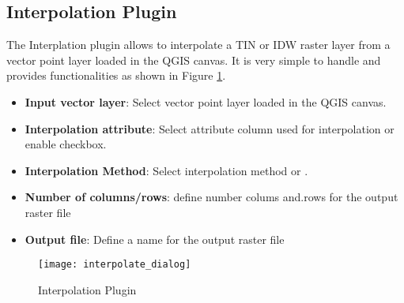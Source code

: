 
\subsection{Interpolation Plugin}


The Interplation plugin allows to interpolate a TIN or IDW raster layer from a vector 
point layer loaded in the QGIS canvas. It is very simple to handle and provides 
functionalities as shown in Figure \ref{fig:interpolation_dialog}.

\begin{itemize}
\item \textbf{Input vector layer}: Select vector point layer loaded in the QGIS canvas.
\item \textbf{Interpolation attribute}: Select attribute column used for interpolation or 
enable  checkbox.
\item \textbf{Interpolation Method}: Select interpolation method  or .
\item \textbf{Number of columns/rows}: define number colums and.rows for the output raster file
\item \textbf{Output file}: Define a name for the output raster file
\end{itemize}

\begin{figure}[ht]
   \begin{center}
   \caption{Interpolation Plugin \nixcaption}\label{fig:interpolation_dialog}\smallskip
   \texttt{[image: interpolate\_dialog]}
\end{center}  
\end{figure}

